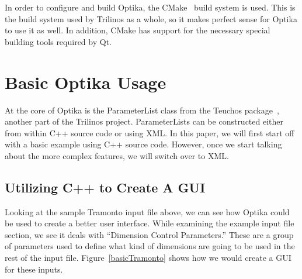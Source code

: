 In order to configure and build Optika, the CMake~\cite{cmake} build system is used. This is the build system
used by Trilinos as a whole, so it makes perfect sense for Optika to use it as well. In addition, CMake
has support for the necessary special building tools required by Qt.

\section{Basic Optika Usage}
At the core of Optika is the ParameterList class from the Teuchos package~\cite{TeuchosPackage}, another part
of the Trilinos project. ParameterLists can be constructed either from within C++ source code or using XML.
In this paper, we will first start off with a basic example using C++ source code. However, once we start
talking about the more complex features, we will switch over to XML.
\subsection{Utilizing C++ to Create A GUI}
Looking at the sample Tramonto input file above, we can see how Optika could be used to create a better user interface.
While examining the example input file section, we see it deals with ``Dimension Control Parameters.'' These are a group of parameters 
used to define what kind of dimensions are going to be used in the rest of the input file. Figure~\ref{basicTramonto} shows how we would create
a GUI for these inputs.

